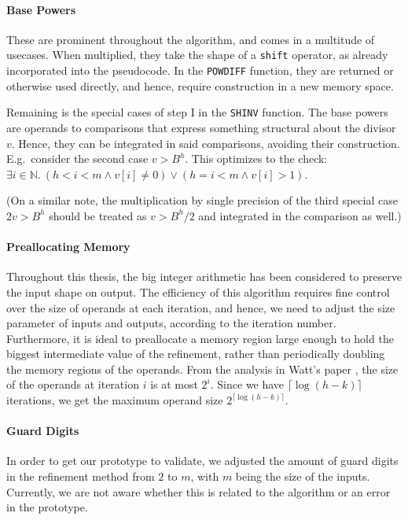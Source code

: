 \paragraph{Base Powers}
These are prominent throughout the algorithm, and comes in a multitude of
usecases. When multiplied, they take the shape of a \texttt{shift} operator, as
already incorporated into the pseudocode. In the \texttt{POWDIFF} function, they
are returned or otherwise used directly, and hence, require construction in a
new memory space.

Remaining is the special cases of step I in the \texttt{SHINV} function. The
base powers are operands to comparisons that express something structural about
the divisor $v$. Hence, they can be integrated in said comparisons, avoiding
their construction.  E.g.\ consider the second case $v > B^h$. This optimizes to
the check: $\exists i\in \mathbb{N}.~(h<i<m \land v[i] \neq 0) \lor (h = i<m \land v[i] > 1)$.

(On a similar note, the multiplication by single precision of the third special
case $2v > B^h$ should be treated as $v > B^h/2$ and integrated in the
comparison as well.)

\paragraph{Preallocating Memory}
Throughout this thesis, the big integer arithmetic has been considered to preserve
the input shape on output. The efficiency of this algorithm requires fine control
over the size of operands at each iteration, and hence, we need to adjust the
size parameter of inputs and outputs, according to the iteration
number. Furthermore, it is ideal to preallocate a memory region large enough to
hold the biggest intermediate value of the refinement, rather than periodically
doubling the memory regions of the operands. From the analysis in Watt's paper
\cite{watt2023efficient}, the size of the operands at iteration $i$ is at most
$2^i$. Since we have $\lceil \log (h-k) \rceil$ iterations, we get the maximum operand
size $2^{\lceil \log (h-k) \rceil}$.


\paragraph{Guard Digits}
In order to get our prototype to validate, we adjusted the amount of guard
digits in the refinement method from $2$ to $m$, with $m$ being the size of the
inputs. Currently, we are not aware whether this is related to the algorithm or
an error in the prototype.

